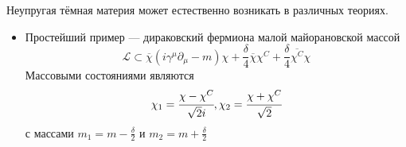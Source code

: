 Неупругая тёмная материя может естественно возникать в различных теориях.
\begin{itemize}
	\item Простейший пример --- дираковский фермиона малой майорановской массой
	\begin{equation*}
		\mathcal{L} \subset \overline{\chi}( i\gamma^{\mu} \partial_{\mu} - m)\chi + 
		\frac{\delta}{4} \overline{\chi} \chi^C + \frac{\delta}{4} \overline{\chi^C} \chi %
	\end{equation*}
	Массовыми состояниями являются 
	\begin{eqnarray*}
		\chi_1 = \cfrac{\chi - \chi^C}{\sqrt{2} i} 
		,\chi_2 = \cfrac{\chi+ \chi^C}{\sqrt{2}}
	\end{eqnarray*}
	с массами $m_1 = m - \frac{\delta}{2}$ и  $m_2 = m + \frac{\delta}{2}$
\end{itemize}